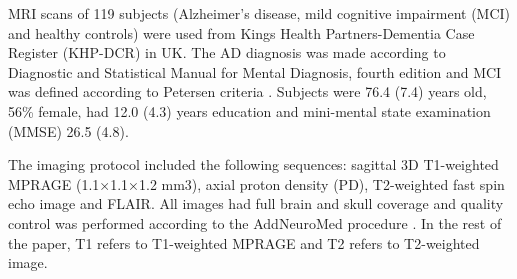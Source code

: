 MRI scans of 119 subjects (Alzheimer’s disease, mild cognitive impairment (MCI) and healthy controls) were used from Kings Health Partners-Dementia Case Register (KHP-DCR) in UK. The AD diagnosis was made according to Diagnostic and Statistical Manual for Mental Diagnosis, fourth edition and MCI was defined according to Petersen criteria \cite{10190820}. Subjects were 76.4 (7.4) years old, 56\% female, had 12.0 (4.3) years education and mini-mental state examination (MMSE) 26.5 (4.8).
\par
The imaging protocol included the following sequences: sagittal 3D T1-weighted MPRAGE (1.1×1.1×1.2 mm3), axial proton density (PD), T2-weighted fast spin echo image and FLAIR. All images had full brain and skull coverage and quality control was performed according to the AddNeuroMed procedure \cite{21157852}. In the rest of the paper, T1 refers to T1-weighted MPRAGE and T2 refers to T2-weighted image.

    
    
    
    
    